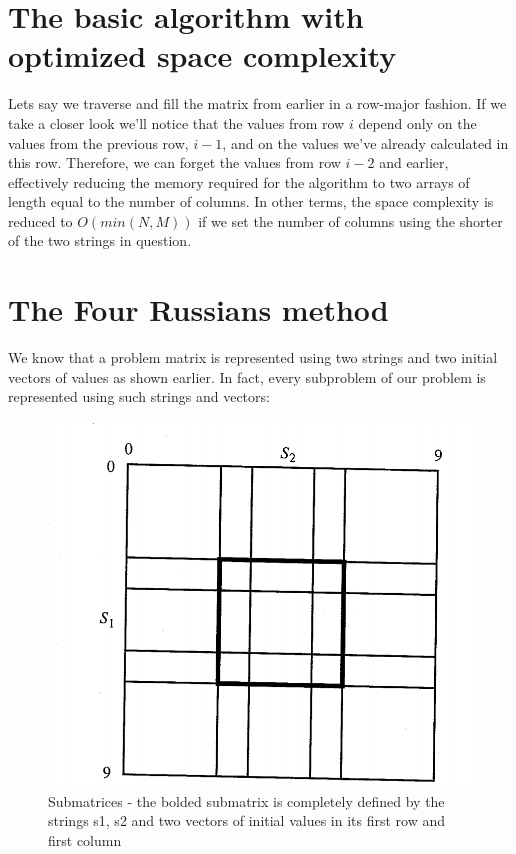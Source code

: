 \documentclass[times, utf8, seminar, numeric]{fer}
\begin{document}
\section{The basic algorithm with optimized space complexity}
Lets say we traverse and fill the matrix from earlier in a row-major fashion. If we take a closer look we'll notice that the values from row $i$ depend only on the values from the previous row, $i-1$, and on the values we've already calculated in this row. Therefore, we can forget the values from row $i-2$ and earlier, effectively reducing the memory required for the algorithm to two arrays of length equal to the number of columns. In other terms, the space complexity is reduced to $O(min(N, M))$ if we set the number of columns using the shorter of the two strings in question.

\section{The Four Russians method}
We know that a problem matrix is represented using two strings and two initial vectors of values as shown earlier. In fact, every subproblem of our problem is represented using such strings and vectors:

\begin{figure}[H]
\centering
\includegraphics[scale=.25]{s1}
\caption{Submatrices - the bolded submatrix is completely defined by the strings s1, s2 and two vectors of initial values in its first row and first column}\label{pic:s1}
\end{figure}
\end{document}
